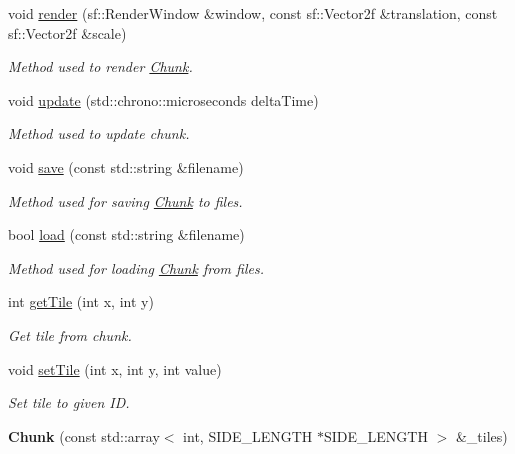 \begin{DoxyCompactItemize}
\item 
void \hyperlink{classChunk_a0353e35c14d4f576542660bb762db51f}{render} (sf\-::\-Render\-Window \&window, const sf\-::\-Vector2f \&translation, const sf\-::\-Vector2f \&scale)
\begin{DoxyCompactList}\small\item\em Method used to render \hyperlink{classChunk}{Chunk}. \end{DoxyCompactList}\item 
void \hyperlink{classChunk_aa794fcda8fe859680cbfe4a2bcd5d097}{update} (std\-::chrono\-::microseconds delta\-Time)
\begin{DoxyCompactList}\small\item\em Method used to update chunk. \end{DoxyCompactList}\item 
void \hyperlink{classChunk_ac3e70286e057eb0f93accec639047097}{save} (const std\-::string \&filename)
\begin{DoxyCompactList}\small\item\em Method used for saving \hyperlink{classChunk}{Chunk} to files. \end{DoxyCompactList}\item 
bool \hyperlink{classChunk_afa9fe7d9713cbf4fbe75520dd760880a}{load} (const std\-::string \&filename)
\begin{DoxyCompactList}\small\item\em Method used for loading \hyperlink{classChunk}{Chunk} from files. \end{DoxyCompactList}\item 
int \hyperlink{classChunk_a0e4673d23721ffed257c11499179a4b3}{get\-Tile} (int x, int y)
\begin{DoxyCompactList}\small\item\em Get tile from chunk. \end{DoxyCompactList}\item 
void \hyperlink{classChunk_a2027949ed92132d341f4e7c778ce9ebd}{set\-Tile} (int x, int y, int value)
\begin{DoxyCompactList}\small\item\em Set tile to given I\-D. \end{DoxyCompactList}\item 
\hypertarget{classChunk_a140f2fc8f419f8f5f6cf5483abbb365a}{{\bfseries Chunk} (const std\-::array$<$ int, S\-I\-D\-E\-\_\-\-L\-E\-N\-G\-T\-H $\ast$S\-I\-D\-E\-\_\-\-L\-E\-N\-G\-T\-H $>$ \&\-\_\-tiles)}\label{classChunk_a140f2fc8f419f8f5f6cf5483abbb365a}

\end{DoxyCompactItemize}
